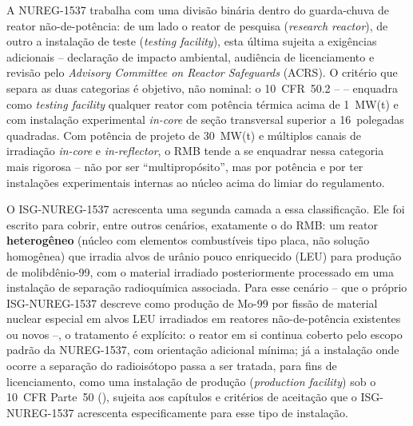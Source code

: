 A NUREG-1537 trabalha com uma divis\~ao bin\'aria dentro do guarda-chuva
de reator n\~ao-de-pot\^encia: de um lado o reator de pesquisa
(\emph{research reactor}), de outro a instala\c{c}\~ao de teste
(\emph{testing facility}), esta \'ultima sujeita a exig\^encias
adicionais -- declara\c{c}\~ao de impacto ambiental, audi\^encia de
licenciamento e revis\~ao pelo \emph{Advisory Committee on Reactor
Safeguards} (ACRS). O crit\'erio que separa as duas categorias \'e
objetivo, n\~ao nominal: o 10~CFR~50.2 -- \citep{cfr10p50} -- enquadra como \emph{testing
facility} qualquer reator com pot\^encia t\'ermica acima de 1~MW(t) e com
instala\c{c}\~ao experimental \emph{in-core} de se\c{c}\~ao transversal
superior a 16~polegadas quadradas. Com pot\^encia de projeto de 30~MW(t)
e m\'ultiplos canais de irradia\c{c}\~ao \emph{in-core} e
\emph{in-reflector}, o RMB tende a se enquadrar nessa categoria mais
rigorosa -- n\~ao por ser ``multiprop\'osito'', mas por pot\^encia e por
ter instala\c{c}\~oes experimentais internas ao n\'ucleo acima do limiar
do regulamento.

O ISG-NUREG-1537 acrescenta uma segunda camada a
essa classifica\c{c}\~ao. Ele foi escrito para cobrir, entre outros
cen\'arios, exatamente o do RMB: um reator \textbf{heterog\^eneo}
(n\'ucleo com elementos combust\'iveis tipo placa, n\~ao solu\c{c}\~ao
homog\^enea) que irradia alvos de ur\^anio pouco enriquecido (LEU) para
produ\c{c}\~ao de molibd\^enio-99, com o material irradiado
posteriormente processado em uma instala\c{c}\~ao de separa\c{c}\~ao
radioqu\'imica associada. Para esse cen\'ario -- que o pr\'oprio ISG-NUREG-1537
descreve como produ\c{c}\~ao de Mo-99 por fiss\~ao de material nuclear
especial em alvos LEU irradiados em reatores n\~ao-de-pot\^encia
existentes ou novos --, o tratamento \'e expl\'icito: o reator em si
continua coberto pelo escopo padr\~ao da NUREG-1537, com orienta\c{c}\~ao
adicional m\'inima; j\'a a instala\c{c}\~ao onde ocorre a separa\c{c}\~ao
do radiois\'otopo passa a ser tratada, para fins de licenciamento, como
uma instala\c{c}\~ao de produ\c{c}\~ao (\emph{production facility}) sob o
10~CFR Parte~50 (\citealp{cfr10p50}), sujeita aos cap\'itulos e crit\'erios de aceita\c{c}\~ao
que o ISG-NUREG-1537 acrescenta especificamente para esse tipo de instala\c{c}\~ao.

